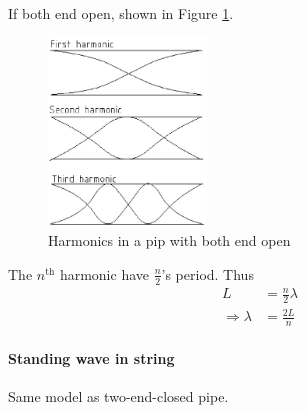             If both end open, shown in Figure \ref{stan_0endpip}.
            \begin{figure}[H]
                \begin{center}
                    \includegraphics[height=5cm]{wave_charts/stan_wav_0endpipe.eps}
                \end{center}
                \caption{Harmonics in a pip with both end open}
                \label{stan_0endpip}
            \end{figure}

            The $n^{\mathrm{th}}$ harmonic have $\frac{n}{2}$'s period. Thus
            \begin{align}
                L &= \frac{n}{2} \lambda \\
                \Rightarrow \lambda &= \frac{2 L}{n}
            \end{align}

        \paragraph{Standing wave in string}
            Same model as two-end-closed pipe.